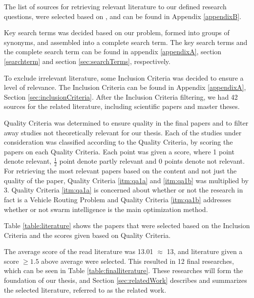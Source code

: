 The list of sources for retrieving relevant literature to our defined research questions, were selected based on \citep[p.3]{kofod2014}, and can be found in Appendix \vref{appendixB}. 

Key search terms was decided based on our problem, formed into groups of synonyms, and assembled into a complete search term. The key search terms and the complete search term can be found in appendix \ref{appendixA}, section \vref{searchterm} and section \vref{sec:searchTerms}, respectively.

To exclude irrelevant literature, some Inclusion Criteria was decided to ensure a level of relevance. The Inclusion Criteria can be found in Appendix \ref{appendixA}, Section \vref{sec:inclusionCriteria}. After the Inclusion Criteria filtering, we had 42 sources for the related literature, including scientific papers and master theses. 

Quality Criteria was determined to ensure quality in the final papers and to filter away studies not theoretically relevant for our thesis. Each of the studies under consideration was classified according to the Quality Criteria, by scoring the papers on each Quality Criteria. Each point was given a score, where 1 point denote relevant, $\frac{1}{2}$ point denote partly relevant and 0 points denote not relevant. For retrieving the most relevant papers based on the content and not just the quality of the paper, Quality Criteria \ref{itm:qa1a} and \vref{itm:qa1b} was multiplied by 3. Quality Criteria \ref{itm:qa1a} is concerned about whether or not the research in fact is a Vehicle Routing Problem and Quality Criteria \ref{itm:qa1b} addresses whether or not swarm intelligence is the main optimization method. 

Table \vref{table:literature} shows the papers that were selected based on the Inclusion Criteria and the scores given based on Quality Criteria.

The average score of the read literature was 13.01 $\approx$ 13, and literature given a score $\geq{1.5}$ above average were selected. This resulted in 12 final researches, which can be seen in Table \vref{table:finalliterature}. These researches will form the foundation of our thesis, and Section \vref{sec:relatedWork} describes and summarizes the selected literature, referred to as the related work. 

